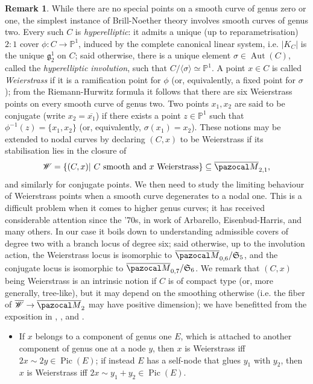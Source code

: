 \documentclass[11pt]{amsart}
\newcommand{\PP}{\mathbb P}
\renewcommand{\to}{\rightarrow}
\newcommand{\oM}{\overline{\pazocal M}}
\newcommand{\Pic}{\operatorname{Pic}}
\newcommand{\Aut}{\operatorname{Aut}}
\theoremstyle{plain}
\theoremstyle{definition}
\newtheorem{rem}[thm]{Remark}
\begin{document}
\begin{rem}
 While there are no special points on a smooth curve of genus zero or one, the simplest instance of Brill-Noether theory involves smooth curves of genus two. Every such $C$ is \emph{hyperelliptic}: it admits a unique (up to reparametrisation) $2:1$ cover $\phi\colon C\to\PP^1$, induced by the complete canonical linear system, i.e. $\lvert K_C\rvert$ is the unique $\mathfrak g^1_2$ on $C$; said otherwise, there is a unique element $\sigma\in\Aut(C)$, called the \emph{hyperelliptic involution}, such that $C/\langle\sigma\rangle\simeq\PP^1$. A point $x\in C$ is called \emph{Weierstrass} if it is a ramification point for $\phi$ (or, equivalently, a fixed point for $\sigma$); from the Riemann-Hurwitz formula it follows that there are six Weierstrass points on every smooth curve of genus two. Two points $x_1,x_2$ are said to be conjugate (write $x_2=\overline{x_1}$) if there exists a point $z\in\PP^1$ such that $\phi^{-1}(z)=\{x_1,x_2\}$ (or, equivalently, $\sigma(x_1)=x_2$). These notions may be extended to nodal curves by declaring $(C,x)$ to be Weierstrass if its stabilisation lies in the closure of
 \[\mathcal W=\{(C,x)|\ C\text{ smooth and } x \text{ Weierstrass}\}\subseteq\oM_{2,1},\]
 and similarly for conjugate points. We then need to study the limiting behaviour of Weierstrass points when a smooth curve degenerates to a nodal one. This is a difficult problem when it comes to higher genus curves; it has received considerable attention since the '70s, in work of Arbarello, Eisenbud-Harris, and many others. In our case it boils down to understanding admissible covers \cite{HarrisMumford} of degree two with a branch locus of degree six; said otherwise, up to the involution action, the Weierstrass locus is isomorphic to $\oM_{0,6}/\mathfrak S_5$, and the conjugate locus is isomorphic to  $\oM_{0,7}/\mathfrak S_6$. We remark that $(C,x)$ being Weierstrass is an intrinsic notion if $C$ is of compact type (or, more generally, tree-like), but it may depend on the smoothing otherwise (i.e. the fiber of $\overline{\mathcal W}\to\oM_2$ may have positive dimension); we have benefitted from the exposition in \cite[Appendix 2]{Diaz}, \cite[Proposition (3.0.6)]{Cukierman}, and \cite[Theorem 5.45]{HM}.
 \begin{itemize}[leftmargin=.5cm]
  \item If $x$ belongs to a component of genus one $E$, which is attached to another component of genus one at a node $y$, then $x$ is Weierstrass iff $2x\sim 2y\in\Pic(E)$; if instead $E$ has a self-node that glues $y_1$ with $y_2$, then $x$ is Weierstrass iff $2x\sim y_1+y_2\in\Pic(E)$.
  

\end{itemize}
\end{rem}
\end{document}
